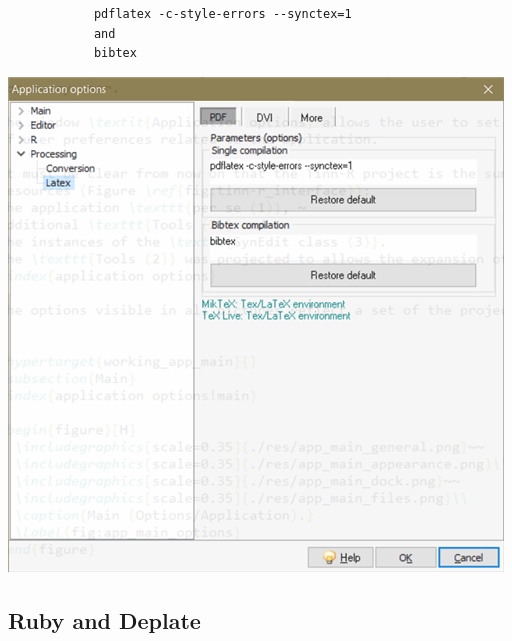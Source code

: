 \begin{itemize}
\begin{itemize}
        \begin{footnotesize}
          \begin{verbatim}
            pdflatex -c-style-errors --synctex=1
            and
            bibtex
          \end{verbatim}
        \end{footnotesize}

        \includegraphics[scale=0.60]{./res/app_processing_latex_pdf.png}\\
    \end{itemize}
\end{itemize}


\subsection{Ruby and Deplate}

